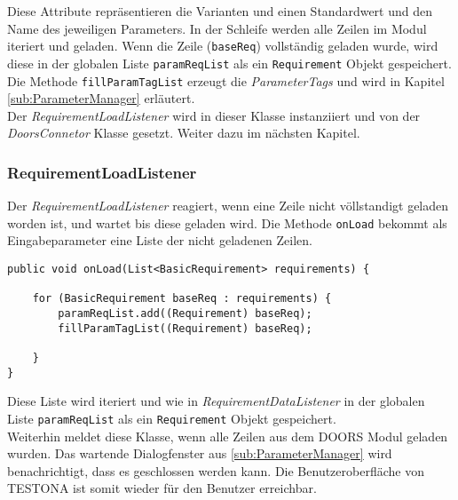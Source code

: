 Diese Attribute repräsentieren die Varianten und einen Standardwert und den Name des jeweiligen Parameters. In der Schleife werden alle Zeilen im Modul iteriert und geladen. Wenn die Zeile (\texttt{baseReq}) vollständig geladen wurde, wird diese in der globalen Liste \texttt{paramReqList} als ein \texttt{Requirement} Objekt gespeichert. Die Methode \texttt{fillParamTagList} erzeugt die \textit{ParameterTags} und wird in Kapitel \ref{sub:ParameterManager} erläutert.\\

Der \textit{RequirementLoadListener} wird in dieser Klasse instanziiert und von der \textit{DoorsConnetor} Klasse gesetzt. Weiter dazu im nächsten Kapitel.


\subsubsection{RequirementLoadListener}\label{sub.RequirementLoadListener}
Der \textit{RequirementLoadListener} reagiert, wenn eine Zeile nicht völlstandigt geladen worden ist, und wartet bis diese geladen wird. Die Methode \texttt{onLoad} bekommt als Eingabeparameter eine Liste der nicht geladenen Zeilen.

\begin{lstlisting}[caption={Nachladen der Parametertabelle nach Zeilen}, captionpos=b]
public void onLoad(List<BasicRequirement> requirements) {

	for (BasicRequirement baseReq : requirements) {
		paramReqList.add((Requirement) baseReq);
		fillParamTagList((Requirement) baseReq);
		
	}
}
\end{lstlisting}

Diese Liste wird iteriert und wie in \textit{RequirementDataListener} in der globalen Liste \texttt{paramReqList} als ein \texttt{Requirement} Objekt gespeichert.\\

Weiterhin meldet diese Klasse, wenn alle Zeilen aus dem DOORS Modul geladen wurden. Das wartende Dialogfenster aus \ref{sub:ParameterManager} wird benachrichtigt, dass es geschlossen werden kann. Die Benutzeroberfläche von TESTONA ist somit wieder für den Benutzer erreichbar.



\newpage
